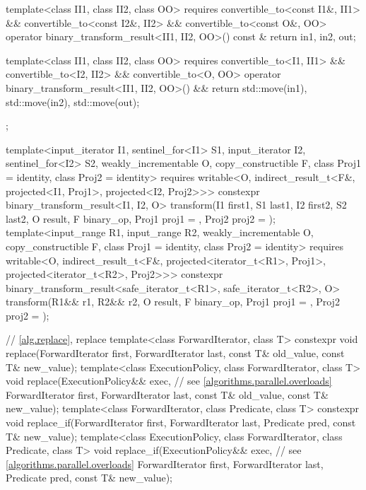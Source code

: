 \begin{codeblock}
{{{      template<class II1, class II2, class OO>
        requires convertible_to<const I1&, II1> &&
          convertible_to<const I2&, II2> && convertible_to<const O&, OO>
        operator binary_transform_result<II1, II2, OO>() const & {
          return {in1, in2, out};
        }

      template<class II1, class II2, class OO>
        requires convertible_to<I1, II1> &&
          convertible_to<I2, II2> && convertible_to<O, OO>
        operator binary_transform_result<II1, II2, OO>() && {
          return {std::move(in1), std::move(in2), std::move(out)};
        }
    };

    template<input_iterator I1, sentinel_for<I1> S1, input_iterator I2, sentinel_for<I2> S2,
             weakly_incrementable O, copy_constructible F, class Proj1 = identity,
             class Proj2 = identity>
      requires writable<O, indirect_result_t<F&, projected<I1, Proj1>,
                                             projected<I2, Proj2>>>
      constexpr binary_transform_result<I1, I2, O>
        transform(I1 first1, S1 last1, I2 first2, S2 last2, O result,
                  F binary_op, Proj1 proj1 = {}, Proj2 proj2 = {});
    template<input_range R1, input_range R2, weakly_incrementable O,
             copy_constructible F, class Proj1 = identity, class Proj2 = identity>
      requires writable<O, indirect_result_t<F&, projected<iterator_t<R1>, Proj1>,
                                             projected<iterator_t<R2>, Proj2>>>
      constexpr binary_transform_result<safe_iterator_t<R1>, safe_iterator_t<R2>, O>
        transform(R1&& r1, R2&& r2, O result,
                  F binary_op, Proj1 proj1 = {}, Proj2 proj2 = {});
  }

  // \ref{alg.replace}, replace
  template<class ForwardIterator, class T>
    constexpr void replace(ForwardIterator first, ForwardIterator last,
                           const T& old_value, const T& new_value);
  template<class ExecutionPolicy, class ForwardIterator, class T>
    void replace(ExecutionPolicy&& exec,                        // see \ref{algorithms.parallel.overloads}
                 ForwardIterator first, ForwardIterator last,
                 const T& old_value, const T& new_value);
  template<class ForwardIterator, class Predicate, class T>
    constexpr void replace_if(ForwardIterator first, ForwardIterator last,
                              Predicate pred, const T& new_value);
  template<class ExecutionPolicy, class ForwardIterator, class Predicate, class T>
    void replace_if(ExecutionPolicy&& exec,                     // see \ref{algorithms.parallel.overloads}
                    ForwardIterator first, ForwardIterator last,
                    Predicate pred, const T& new_value);

}
\end{codeblock}
